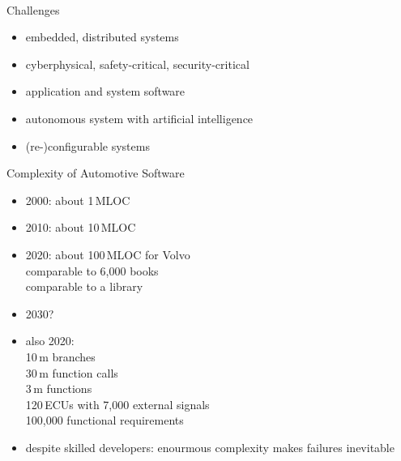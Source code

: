 \begin{frame}{\insertsubsection\ \mytitlesource{\broy}}
	\begin{fancycolumns}
		\begin{definition}{Challenges\mysource{\staron}}
			\begin{itemize}
				\item embedded, distributed systems
				\item cyberphysical, safety-critical, security-critical
				\item application and system software
				\item autonomous system with artificial intelligence
				\item (re-)configurable systems
			\end{itemize}
		\end{definition}
		\nextcolumn
		\begin{definition}{Complexity of Automotive Software\mysource{\antinyan}}
			\begin{itemize}
				\item 2000: about 1\,MLOC
				\item 2010: about 10\,MLOC
				\item 2020: about 100\,MLOC for Volvo\\comparable to 6,000 books\\comparable to a library
				\item 2030?
				\item also 2020:\\10\,m branches\\30\,m function calls\\3\,m functions\\120\,ECUs with 7,000 external signals\\100,000 functional requirements
				\item despite skilled developers: enourmous complexity makes failures inevitable
			\end{itemize}
		\end{definition}
	\end{fancycolumns}
\end{frame}

